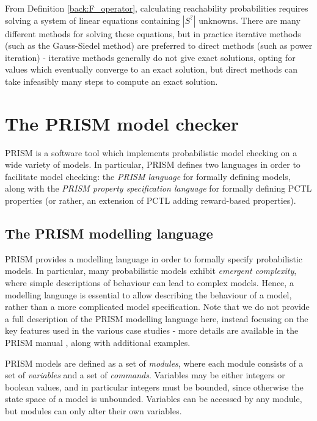 From Definition \ref{back:F_operator}, calculating reachability probabilities requires solving a system of linear equations containing $|S^{?}|$ unknowns. There are many different methods for solving these equations, but in practice iterative methods (such as the Gauss-Siedel method) are preferred to direct methods (such as power iteration) - iterative methods generally do not give exact solutions, opting for values which eventually converge to an exact solution, but direct methods can take infeasibly many steps to compute an exact solution.

\section{The PRISM model checker}
\label{back:PRISM}

PRISM \cite{kwiatkowska_prism_2011} is a software tool which implements probabilistic model checking on a wide variety of models. In particular, PRISM defines two languages in order to facilitate model checking: the \emph{PRISM language} for formally defining models, along with the \emph{PRISM property specification language} for formally defining PCTL properties (or rather, an extension of PCTL adding reward-based properties).

\subsection{The PRISM modelling language}
\label{back:PRISM-modelling}

PRISM provides a modelling language in order to formally specify probabilistic models. In particular, many probabilistic models exhibit \emph{emergent complexity}, where simple descriptions of behaviour can lead to complex models. Hence, a modelling language is essential to allow describing the behaviour of a model, rather than a more complicated model specification. Note that we do not provide a full description of the PRISM modelling language here, instead focusing on the key features used in the various case studies - more details are available in the PRISM manual \cite{noauthor_prism_nodate}, along with additional examples.

PRISM models are defined as a set of \emph{modules}, where each module consists of a set of \emph{variables} and a set of \emph{commands}. Variables may be either integers or boolean values, and in particular integers must be bounded, since otherwise the state space of a model is unbounded. Variables can be accessed by any module, but modules can only alter their own variables.

